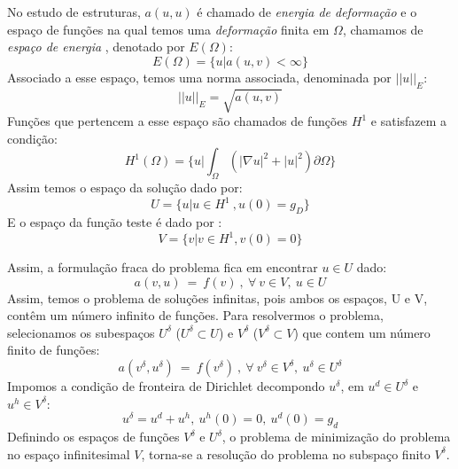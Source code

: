  No estudo de estruturas,  $a(u,u)$ é chamado de \emph{energia de deformação} e o espaço de funções na qual temos uma \emph{deformação} finita em $\Omega$, chamamos de \emph{espaço de energia} , denotado por $E(\Omega)$:
\begin{equation}
 E(\Omega) = \lbrace u | a(u,v) < \infty \rbrace
\end{equation}
  Associado a esse espaço, temos uma norma associada, denominada por $||u||_E$:
\begin{equation}
 ||u||_{E} = \sqrt{a(u,v)}
\end{equation}
 Funções que pertencem a esse espaço são chamados de funções $H^1$ e satisfazem a condição:
 \begin{equation}
 H^1(\Omega) = \bigg\{ u| \int_\Omega (|\nabla u|^2 + |u|^2) \partial \Omega  \bigg\}
 \end{equation}
  Assim temos o espaço da solução dado por:
\begin{equation}
U = \lbrace u| u \in H^1\ , u(0) = g_D  \rbrace
\end{equation}
 E o espaço da função teste é dado por :
\begin{equation}
V = \lbrace v | v \in H^1, v(0)=0 \rbrace
\end{equation}

 Assim, a formulação fraca do problema fica em encontrar $u \in U$ dado:
 \begin{equation}
 a(v,u)\ =\ f(v)\ ,\ \forall\ v \in V,\ u \in U
 \end{equation}
 Assim, temos o problema de soluções infinitas, pois ambos os espaços, U e V, contêm um número infinito de funções. Para resolvermos o problema, selecionamos os subespaços $U^\delta$ ($ U^\delta \subset U$) e $V^\delta$ ($ V^\delta \subset V$) que contem um número finito de funções:
  \begin{equation}
 a(v^\delta,u^\delta)\ =\ f(v^\delta)\ ,\ \forall\ v^\delta \in V^\delta,\ u^\delta \in U^\delta
 \end{equation}
Impomos a condição de fronteira de Dirichlet decompondo $u^\delta$, em $u^d \in U^\delta$ e $u^h \in V^\delta$:
\begin{equation}
 u^\delta = u^d + u^h,\ u^h(0) = 0,\ u^d(0) = g_d
\end{equation}
 Definindo os espaços de funções $V^\delta$ e $U^\delta$, o problema de minimização do problema no espaço infinitesimal $V$, torna-se a resolução do problema no subspaço finito $V^\delta$.
